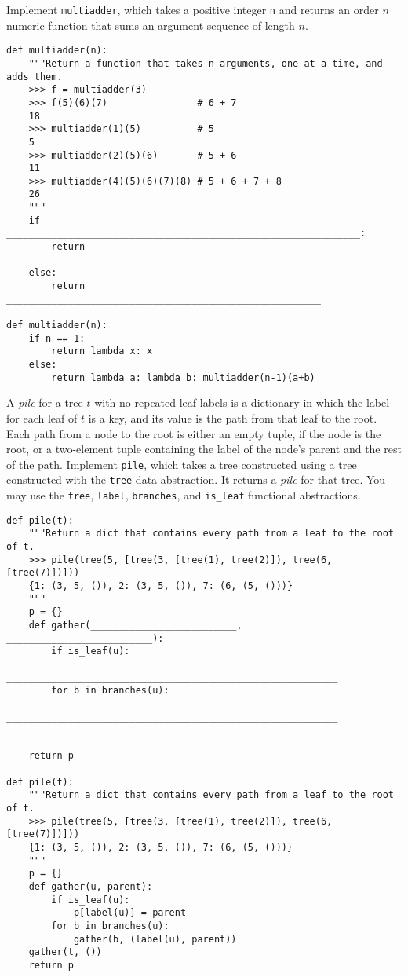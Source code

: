 \documentclass[11pt]{article}
\begin{document}
\begin{qlist}

Implement \texttt{multiadder}, which takes a positive integer \texttt{n} and returns an order $n$ numeric function that sums an argument sequence of length $n$.
\begin{verbatim}
def multiadder(n):
    """Return a function that takes n arguments, one at a time, and adds them.
    >>> f = multiadder(3)
    >>> f(5)(6)(7)                # 6 + 7
    18
    >>> multiadder(1)(5)          # 5
    5
    >>> multiadder(2)(5)(6)       # 5 + 6
    11
    >>> multiadder(4)(5)(6)(7)(8) # 5 + 6 + 7 + 8
    26
    """
    if _______________________________________________________________:
        return ________________________________________________________
    else:
        return ________________________________________________________

def multiadder(n):
    if n == 1:
        return lambda x: x
    else:
        return lambda a: lambda b: multiadder(n-1)(a+b)
\end{verbatim}

\newpage

A \textit{pile} for a tree $t$ with no repeated leaf labels is a dictionary in which the label for each leaf of $t$ is a key, and its value is the path from that leaf to the root. Each path from a node to the root is either an empty tuple, if the node is the root, or a two-element tuple containing the label of the node's parent and the rest of the path. Implement \texttt{pile}, which takes a tree constructed using a tree constructed with the \texttt{tree} data abstraction. It returns a \textit{pile} for that tree. You may use the \texttt{tree}, \texttt{label}, \texttt{branches}, and \texttt{is\_leaf} functional abstractions.
\begin{verbatim}
def pile(t):
    """Return a dict that contains every path from a leaf to the root of t.
    >>> pile(tree(5, [tree(3, [tree(1), tree(2)]), tree(6, [tree(7)])]))
    {1: (3, 5, ()), 2: (3, 5, ()), 7: (6, (5, ()))}
    """
    p = {}
    def gather(__________________________, __________________________):
        if is_leaf(u):
            ___________________________________________________________
        for b in branches(u):
            ___________________________________________________________
    ___________________________________________________________________
    return p

def pile(t):
    """Return a dict that contains every path from a leaf to the root of t.
    >>> pile(tree(5, [tree(3, [tree(1), tree(2)]), tree(6, [tree(7)])]))
    {1: (3, 5, ()), 2: (3, 5, ()), 7: (6, (5, ()))}
    """
    p = {}
    def gather(u, parent):
        if is_leaf(u):
            p[label(u)] = parent
        for b in branches(u):
            gather(b, (label(u), parent))
    gather(t, ())
    return p
\end{verbatim}


\end{qlist}
\end{document}
